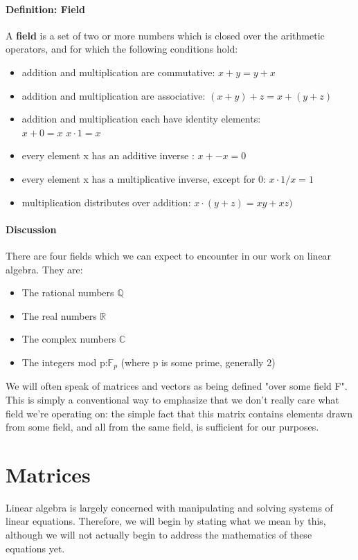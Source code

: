 \documentclass[12pt,letterpaper,final]{article}
\begin{document}
\paragraph{Definition: Field} A \textbf{field} is a set of two or more numbers which is closed over the arithmetic operators, and for which the following conditions hold:
\begin{itemize}
\item addition and multiplication are commutative: $x+y = y+x$
\item addition and multiplication are associative: $(x+y) +z = x+(y+z)$
\item addition and multiplication each have identity elements: \\$x +0=x$ $x \cdot 1 = x$
\item every element x has an additive inverse : $x + -x = 0$
\item every element x has a multiplicative inverse, except for 0: $x \cdot 1/x = 1$
\item multiplication distributes over addition: $x \cdot (y+z) = xy + xz)$
\end{itemize}

\paragraph{Discussion}There are four fields which we can expect to encounter in our work on linear algebra. They are:
\begin{itemize}
\item The rational numbers $\mathbb{Q}$
\item The real numbers $\mathbb{R}$
\item The complex numbers $\mathbb{C}$
\item The integers mod p:$\mathbb{F}_{p}$ (where p is some prime, generally 2)
\end{itemize}

We will often speak of matrices and vectors as being defined "over some field F". This is simply a conventional way to emphasize that we don't really care what field we're operating on: the simple fact that this matrix contains elements drawn from some field, and all from the same field, is sufficient for our purposes. 

\section{Matrices}
Linear algebra is largely concerned with manipulating and solving systems of linear equations.  Therefore, we will begin by stating what we mean by this, although we will not actually begin to address the mathematics of these equations yet. 
\end{document}
